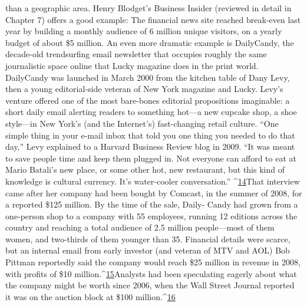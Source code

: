 than a geographic area.
Henry Blodget's Business Insider (reviewed in detail in Chapter 7) offers a
good example: The financial news site reached break-even last year by building
a monthly audience of 6 million unique visitors, on a yearly budget of about \$5
million. An even more dramatic example is DailyCandy, the decade-old trendsurfing
email newsletter that occupies roughly the same journalistic space online
that Lucky magazine does in the print world.
DailyCandy was launched in March 2000 from the kitchen table of Dany Levy,
then a young editorial-side veteran of New York magazine and Lucky. Levy's
venture offered one of the most bare-bones editorial propositions imaginable: a
short daily email alerting readers to something hot—a new cupcake shop, a shoe
style—in New York's (and the Internet's) fast-changing retail culture.
``One simple thing in your e-mail inbox that told you one thing you needed to
do that day,'' Levy explained to a Harvard Business Review blog in 2009. ``It was
meant to save people time and keep them plugged in. Not everyone can afford to
eat at Mario Batali's new place, or some other hot, new restaurant, but this kind
of knowledge is cultural currency. It's water-cooler conversation.'' ^{\href{#endnotes-chapter-3}{14}}That interview came after her company had been bought by Comcast, in the
summer of 2008, for a reported \$125 million. By the time of the sale, Daily-
Candy had grown from a one-person shop to a company with 55 employees,
running 12 editions across the country and reaching a total audience of 2.5 million
people—most of them women, and two-thirds of them younger than 35.
Financial details were scarce, but an internal email from early investor (and veteran
of MTV and AOL) Bob Pittman reportedly said the company would reach
\$25 million in revenue in 2008, with profits of \$10 million.^{\href{#endnotes-chapter-3}{15}}Analysts had been
speculating eagerly about what the company might be worth since 2006, when
the Wall Street Journal reported it was on the auction block at \$100 million.^{\href{#endnotes-chapter-3}{16}}%


